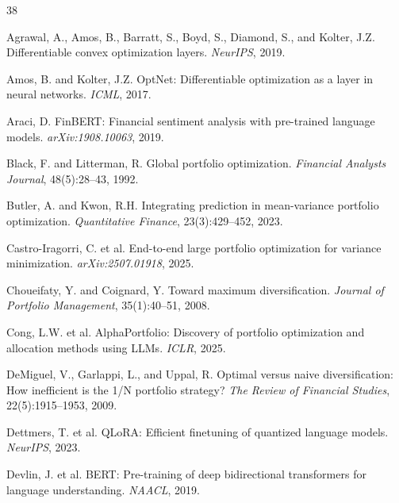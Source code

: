 \documentclass[11pt]{article}
\begin{document}
\clearpage

\begin{thebibliography}{38}

Agrawal, A., Amos, B., Barratt, S., Boyd, S., Diamond, S., and Kolter, J.Z.
\newblock Differentiable convex optimization layers.
\newblock \emph{NeurIPS}, 2019.

Amos, B. and Kolter, J.Z.
\newblock OptNet: Differentiable optimization as a layer in neural networks.
\newblock \emph{ICML}, 2017.

Araci, D.
\newblock FinBERT: Financial sentiment analysis with pre-trained language models.
\newblock \emph{arXiv:1908.10063}, 2019.

Black, F. and Litterman, R.
\newblock Global portfolio optimization.
\newblock \emph{Financial Analysts Journal}, 48(5):28--43, 1992.

Butler, A. and Kwon, R.H.
\newblock Integrating prediction in mean-variance portfolio optimization.
\newblock \emph{Quantitative Finance}, 23(3):429--452, 2023.

Castro-Iragorri, C. et al.
\newblock End-to-end large portfolio optimization for variance minimization.
\newblock \emph{arXiv:2507.01918}, 2025.

Choueifaty, Y. and Coignard, Y.
\newblock Toward maximum diversification.
\newblock \emph{Journal of Portfolio Management}, 35(1):40--51, 2008.

Cong, L.W. et al.
\newblock AlphaPortfolio: Discovery of portfolio optimization and allocation methods using LLMs.
\newblock \emph{ICLR}, 2025.

DeMiguel, V., Garlappi, L., and Uppal, R.
\newblock Optimal versus naive diversification: How inefficient is the 1/N portfolio strategy?
\newblock \emph{The Review of Financial Studies}, 22(5):1915--1953, 2009.

Dettmers, T. et al.
\newblock QLoRA: Efficient finetuning of quantized language models.
\newblock \emph{NeurIPS}, 2023.

Devlin, J. et al.
\newblock BERT: Pre-training of deep bidirectional transformers for language understanding.
\newblock \emph{NAACL}, 2019.


\end{thebibliography}
\end{document}
